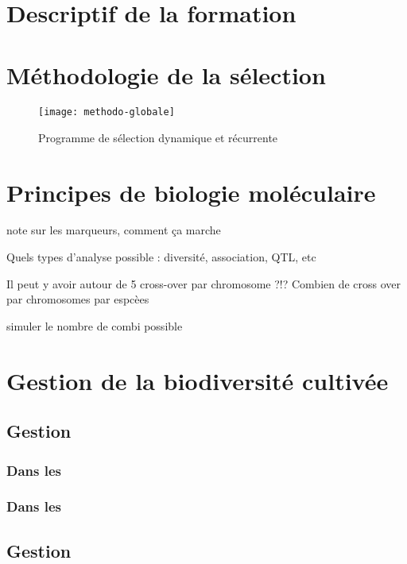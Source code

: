 \newpage ~\\ \newpage \tableofcontents \newpage \pagestyle{plain}


\section*{Descriptif de la formation}



\section{Méthodologie de la sélection}

\begin{figure}[H]
\texttt{[image: methodo-globale]}
\caption{Programme de sélection dynamique et récurrente}
\end{figure}


\section{Principes de biologie moléculaire}

note sur les marqueurs, comment ça marche

Quels types d'analyse possible : diversité, association, QTL, etc

Il peut y avoir autour de 5 cross-over par chromosome ?!? Combien de cross over par chromosomes par espcèes

simuler le nombre de combi possible

\section{Gestion de la biodiversité cultivée}

\subsection{Gestion \exsitu}

\subsubsection{Dans les \CRBs}

\subsubsection{Dans les \MSPs}


\subsection{Gestion \insitu}

